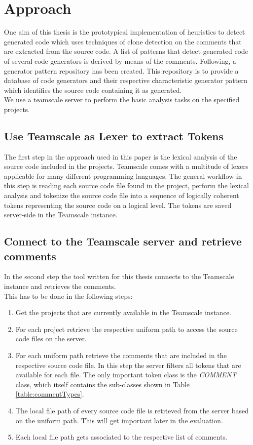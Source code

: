 
\chapter{Approach}\label{chapter:approach}
One aim of this thesis is the prototypical implementation of heuristics to detect generated code which uses techniques of clone detection on the comments that are extracted from the source code. A list of patterns that detect generated code of several code generators is derived by means of the comments. Following, a generator pattern repository has been created. This repository is to provide a database of code generators and their respective characteristic generator pattern which identifies the source code containing it as generated.\\
We use a teamscale server to perform the basic analysis tasks on the specified projects.
\section{Use Teamscale as Lexer to extract Tokens}
The first step in the approach used in this paper is the lexical analysis of the source code included in the projects. Teamscale comes with a multitude of lexers applicable for many different programming languages. The general workflow in this step is reading each source code file found in the project, perform the lexical analysis and tokenize the source code file into a sequence of logically coherent tokens representing the source code on a logical level. The tokens are saved server-side in the Teamscale instance.


\section{Connect to the Teamscale server and retrieve comments}
\label{section:retrieveComments}
In the second step the tool written for this thesis connects to the Teamscale instance and retrieves the comments.\\
This has to be done in the following steps:
\begin{enumerate}
	\item Get the projects that are currently available in the Teamscale instance. 
	\item For each project retrieve the respective uniform path to access the source code files on the server.
	\item For each uniform path retrieve the comments that are included in the respective source code file. In this step the server filters all tokens that are available for each file. The only important token class is the \textit{COMMENT} class, which itself contains the sub-classes shown in Table \ref{table:commentTypes}.
	\item The local file path of every source code file is retrieved from the server based on the uniform path. This will get important later in the evaluation.
	\item Each local file path gets associated to the respective list of comments.
\end{enumerate}

